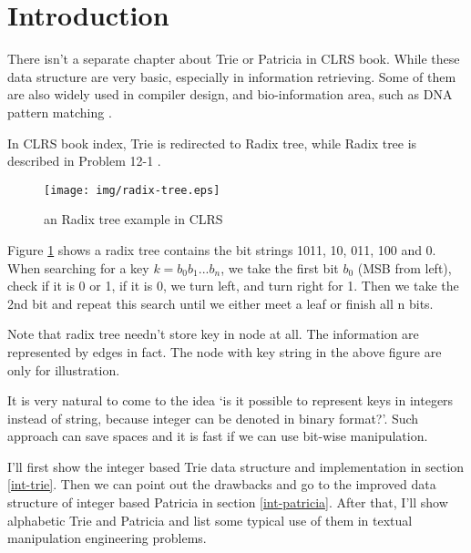 \documentclass{article}
\begin{document}

\maketitle

\section{Introduction}
\label{introduction}

There isn't a separate chapter about Trie or Patricia
in CLRS book. While these data structure are very basic, especially in
information retrieving. Some of them are also widely used in
compiler design\cite{okasaki-int-map}, and bio-information area, such as
DNA pattern matching \cite{wiki-suffix-tree}.

In CLRS book index, Trie is redirected to Radix tree, while Radix tree
is described in Problem 12-1 \cite{CLRS}.

\begin{figure}[htbp]
       \begin{center}
	\texttt{[image: img/radix-tree.eps]}
        \caption{an Radix tree example in CLRS} \label{fig:radix-tree}
       \end{center}
\end{figure}

Figure \ref{fig:radix-tree} shows a radix tree contains the bit
strings 1011, 10, 011, 100 and 0. When searching for a key $k=b_0b_1...b_n$, we
take the first bit $b_0$ (MSB from left), check if it is 0 or 1, if it
is 0, we turn left, and turn right for 1. Then we take the 2nd bit and
repeat this search until we either meet a leaf or finish all n bits.

Note that radix tree needn't store key in node at all. The
information are represented by edges in fact. The node with key string
in the above figure are only for illustration.

It is very natural to come to the idea `is it possible to represent
keys in integers instead of string, because integer can be denoted in
binary format?'. Such approach can save spaces and it is fast if we
can use bit-wise manipulation.

I'll first show the integer based Trie data structure and implementation in
section \ref{int-trie}. Then we can point out the drawbacks and go to
the improved data structure of integer based Patricia in
section \ref{int-patricia}.
After that, I'll show alphabetic Trie and Patricia and list some
typical use of them in textual manipulation engineering problems.
\end{document}
